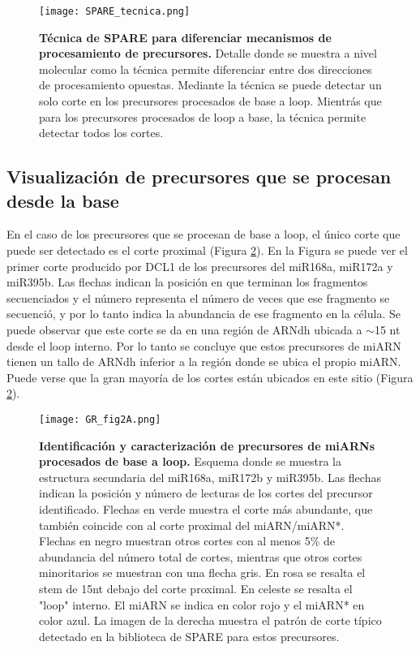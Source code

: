 \begin{figure}[htbp!] 
	\centering    
	\texttt{[image: SPARE\_tecnica.png]}
	\caption[Técnica de SPARE]{
        \textbf{Técnica de SPARE para diferenciar mecanismos de procesamiento de precursores.}
        Detalle donde se muestra a nivel molecular como la técnica permite diferenciar entre dos direcciones de procesamiento opuestas.
        Mediante la técnica se puede detectar un solo corte en los precursores procesados de base a loop.
        Mientrás que para los precursores procesados de loop a base, la técnica permite detectar todos los cortes. 
    }
	 \label{fig:SPARE_tecnica}
\end{figure}

\subsection{Visualización de precursores que se procesan desde la base}

En el caso de los precursores que se procesan de base a loop, el único corte que puede ser detectado es el corte proximal (Figura \ref{fig:GR_fig2A}).
En la Figura se puede ver el primer corte producido por DCL1 de los precursores del miR168a, miR172a y miR395b.
Las flechas indican la posición en que terminan los fragmentos secuenciados y el número representa el número de veces que ese fragmento se secuenció, y por lo tanto indica la abundancia de ese fragmento en la célula.
Se puede observar que este corte se da en una región de ARNdh ubicada a $\sim$15 nt desde el loop interno.
Por lo tanto se concluye que estos precursores de miARN tienen un tallo de ARNdh inferior a la región donde se ubica el propio miARN.
Puede verse que la gran mayoría de los cortes están ubicados en este sitio (Figura \ref{fig:GR_fig2A}).

\begin{figure}[htbp!] 
    \centering    
    \texttt{[image: GR\_fig2A.png]}
    \caption[Identificación y caracterización de precursores de miARNs procesados de base a loop]{
    \textbf{Identificación y caracterización de precursores de miARNs procesados de base a loop.}
            Esquema donde se muestra la estructura secundaria del miR168a, miR172b y miR395b.
            Las flechas indican la posición y número de lecturas de los cortes del precursor identificado.
            Flechas en verde muestra el corte más abundante, que también coincide con al corte proximal del miARN/miARN*.
            Flechas en negro muestran otros cortes con al menos 5\% de abundancia del número total de cortes, mientras que otros cortes minoritarios se muestran con una flecha gris.
            En rosa se resalta el stem de 15nt debajo del corte proximal.
            En celeste se resalta el "loop" interno. 
            El miARN se indica en color rojo y el miARN* en color azul.
            La imagen de la derecha muestra el patrón de corte típico detectado en la biblioteca de SPARE para estos precursores.}
    \label{fig:GR_fig2A}
\end{figure}

